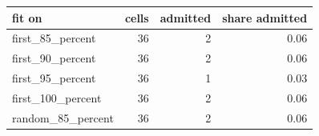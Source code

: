 \begin{tabular}{lrrr}
\toprule
fit on & cells & admitted & share admitted \\
\midrule
first\_85\_percent & 36 & 2 & 0.06 \\
first\_90\_percent & 36 & 2 & 0.06 \\
first\_95\_percent & 36 & 1 & 0.03 \\
first\_100\_percent & 36 & 2 & 0.06 \\
random\_85\_percent & 36 & 2 & 0.06 \\
\bottomrule
\end{tabular}
